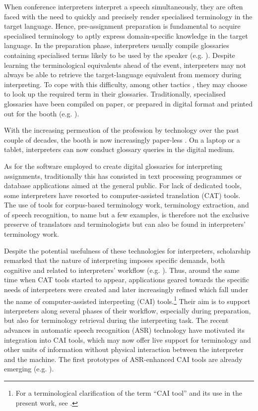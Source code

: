 
When conference interpreters interpret a speech simultaneously, they are often faced with the need to quickly and precisely render specialised terminology in the target language. Hence, pre-assignment preparation is fundamental to acquire specialised terminology to aptly express domain-specific knowledge in the target language. In the preparation phase, interpreters usually compile glossaries containing specialised terms likely to be used by the speaker (e.g. \citealt{rutten_informations-_2007,fantinuoli_computer-assisted_2017,will_terminology_2007,gile_basic_2009}). Despite learning the terminological equivalents ahead of the event, interpreters may not always be able to retrieve the target-language equivalent from memory during interpreting. To cope with this difficulty, among other tactics \citep[14]{gile_basic_2009}, they may choose to look up the required term in their glossaries. Traditionally, specialised glossaries have been compiled on paper, or prepared in digital format and printed out for the booth (e.g. \citealt{jiang_interpreters_2013,jiang2015survey}).

With the increasing permeation of the profession by technology over the past couple of decades, the booth is now increasingly paper-less \citep{rutten2017terminology}. On a laptop or a tablet, interpreters can now conduct glossary queries in the digital medium.

As for the software employed to create digital glossaries for interpreting assignments, traditionally this has consisted in text processing programmes or database applications aimed at the general public. For lack of dedicated tools, some interpreters have resorted to computer-assisted translation (CAT) tools. The use of tools for corpus-based terminology work, terminology extraction, and of speech recognition, to name but a few examples, is therefore not the exclusive preserve of translators and terminologists but can also be found in interpreters' terminology work.

Despite the potential usefulness of these technologies for interpreters, scholarship remarked that the nature of interpreting imposes specific demands, both cognitive and related to interpreters' workflow (e.g. \citealt{rutten_why_2004,will_bemerkungen_2000,will_terminology_2007}). Thus, around the same time when CAT tools started to appear, applications geared towards the specific needs of interpreters were created and later increasingly refined which fall under the name of computer-assisted interpreting (CAI) tools.\footnote{For a terminological clarification of the term ``CAI tool'' and its use in the present work, see .} Their aim is to support interpreters along several phases of their workflow, especially during preparation, but also for terminology retrieval during the interpreting task. The recent advances in automatic speech recognition (ASR) technology have motivated its integration into CAI tools, which may now offer live support for terminology and other units of information without physical interaction between the interpreter and the machine. The first prototypes of ASR-enhanced CAI tools are already emerging (e.g. \citealt{fantinuoli_computer-assisted_2017}).


